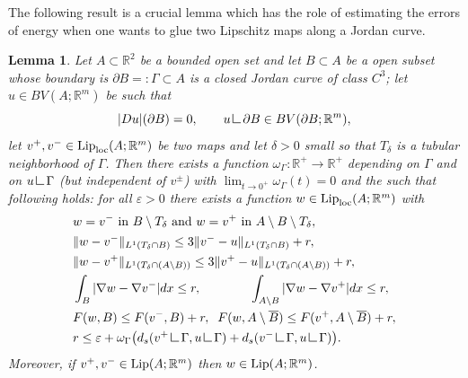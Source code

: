 \documentclass[a4paper,11pt]{article}
\numberwithin{equation}{section}
\newtheorem{lemma}[theorem]{Lemma}
\newcommand{\R}{\mathbb{R}}
\newcommand{\res}      {\mathop{\hbox{\vrule height 7pt width .5pt depth
                        0pt\vrule height .5pt width 6pt depth 0pt}}\nolimits}
\begin{document}
The following result is a crucial lemma which has the role of estimating the errors of energy when one wants to glue two Lipschitz maps along a Jordan curve.

\begin{lemma}\label{lem_glueing1}
	Let $A\subset\R^2$ be a bounded  open set and let $B\subset A$ be a open subset whose boundary is $\partial B=:\Gamma\subset A$ is a  closed Jordan curve of class $C^3$; let $ u\in BV(A;\R^m)$ be such that $$|Du|(\partial B)=0,\qquad u\res\partial B\in BV(\partial B;\R^m),$$ let $v^+,v^-\in\text{{\rm Lip}}_{\text{{\rm loc}}}(A;\R^m)$ be two maps and let $\delta>0$ small so that $T_\delta$ is a tubular neighborhood of $\Gamma$. Then there exists a function $\omega_\Gamma:\R^+\rightarrow \R^+$ depending on $\Gamma$ and on $u\res \Gamma$ (but independent of $v^\pm$) with $\lim_{t\rightarrow 0^+}\omega_\Gamma(t)=0$ and the such that following holds: for all $\varepsilon>0$ there exists a function $w\in\text{{\rm Lip}}_{\text{{\rm loc}}}(A;\R^m)$ with 
	\begin{align}
	&w=v^-\text{ in }B\setminus T_\delta\text{ and }w=v^+\text{ in }A\setminus B\setminus  T_\delta,\nonumber\\
	&\|w-v^-\|_{L^1(T_\delta\cap B)}\leq 3\|v^--u\|_{L^1(T_\delta\cap B)}+r,\nonumber\\
		&\|w-v^+\|_{L^1(T_\delta\cap (A\setminus B))}\leq 3\|v^+-u\|_{L^1(T_\delta\cap (A\setminus B))}+r,\nonumber\\
		&\int_B|\nabla w-\nabla v^-|dx\leq r,\label{glueingthesis}\qquad \qquad \int_{A\setminus B}|\nabla w-\nabla v^+|dx\leq  r,\\
		&F(w, B)\leq F(v^-, B)+r,\;\; F(w,A\setminus \overline B)\leq F(v^+,A\setminus \overline B)+r,\nonumber\\
		&r\leq\varepsilon+\omega_\Gamma\big(d_s(v^+\res \Gamma,u\res\Gamma)+d_s(v^-\res \Gamma,u\res\Gamma)\big).\nonumber
	\end{align}
Moreover, if $v^+,v^-\in\text{{\rm Lip}}(A;\R^m)$ then $w\in\text{{\rm Lip}}(A;\R^m)$.
\end{lemma}
\end{document}
